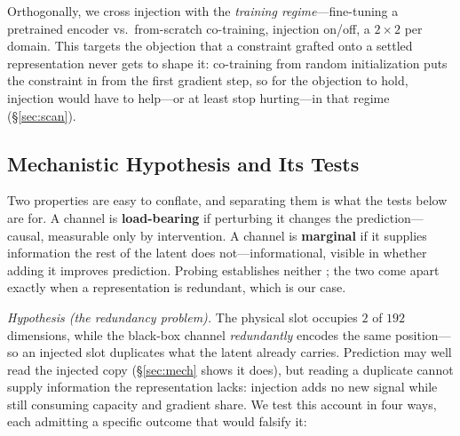 Orthogonally, we cross injection with the \emph{training regime}---fine-tuning a pretrained encoder vs.\ from-scratch co-training, injection on/off, a $2{\times}2$ per domain. This targets the objection that a constraint grafted onto a settled representation never gets to shape it: co-training from random initialization puts the constraint in from the first gradient step, so for the objection to hold, injection would have to help---or at least stop hurting---in that regime (\S\ref{sec:scan}).

\subsection{Mechanistic Hypothesis and Its Tests}
\label{sec:mechtests}

Two properties are easy to conflate, and separating them is what the tests below are for. A channel is \textbf{load-bearing} if perturbing it changes the prediction---causal, measurable only by intervention. A channel is \textbf{marginal} if it supplies information the rest of the latent does not---informational, visible in whether adding it improves prediction. Probing establishes neither \citep{elazar2021amnesic}; the two come apart exactly when a representation is redundant, which is our case.

\emph{Hypothesis (the redundancy problem).} The physical slot occupies $2$ of $192$ dimensions, while the black-box channel \emph{redundantly} encodes the same position---so an injected slot duplicates what the latent already carries. Prediction may well read the injected copy (\S\ref{sec:mech} shows it does), but reading a duplicate cannot supply information the representation lacks: injection adds no new signal while still consuming capacity and gradient share. We test this account in four ways, each admitting a specific outcome that would falsify it:

